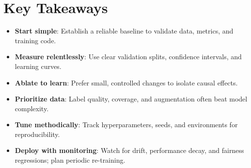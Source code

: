 
\section*{Key Takeaways}

\begin{itemize}[leftmargin=2em]
    \item \textbf{Start simple}: Establish a reliable baseline to validate data, metrics, and training code.
    \item \textbf{Measure relentlessly}: Use clear validation splits, confidence intervals, and learning curves.
    \item \textbf{Ablate to learn}: Prefer small, controlled changes to isolate causal effects.
    \item \textbf{Prioritize data}: Label quality, coverage, and augmentation often beat model complexity.
    \item \textbf{Tune methodically}: Track hyperparameters, seeds, and environments for reproducibility.
    \item \textbf{Deploy with monitoring}: Watch for drift, performance decay, and fairness regressions; plan periodic re-training.
\end{itemize}


